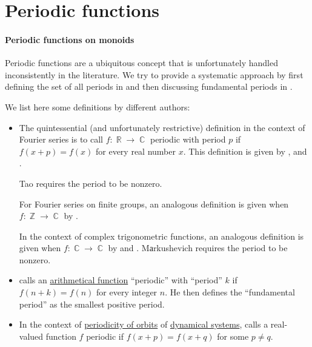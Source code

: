 \section{Periodic functions}\label{sec:periodic_functions}

\paragraph{Periodic functions on monoids}

\begin{remark}\label{rem:periodic_functions_and_periods}
  Periodic functions are a ubiquitous concept that is unfortunately handled inconsistently in the literature. We try to provide a systematic approach by first defining the set of all periods in  and then discussing fundamental periods in .

  We list here some definitions by different authors:
  \begin{itemize}
    \item The quintessential (and unfortunately restrictive) definition in the context of Fourier series is to call \( f: \BbbR \to \BbbC \) periodic with period \( p \) if \( f(x + p) = f(x) \) for every real number \( x \). This definition is given by
    ,
     and
    .

    Tao requires the period to be nonzero.

    For Fourier series on finite groups, an analogous definition is given when \( f: \BbbZ \to \BbbC \) by .

    In the context of complex trigonometric functions, an analogous definition is given when \( f: \BbbC \to \BbbC \) by  and . Mаrkushevich requires the period to be nonzero.

    \item {} calls an \hyperref[def:arithmetic_function]{arithmetical function} \enquote{periodic} with \enquote{period} \( k \) if \( f(n + k) = f(n) \) for every integer \( n \). He then defines the \enquote{fundamental period} as the smallest positive period.

    \item In the context of \hyperref[def:orbit_periodicity]{periodicity of orbits} of \hyperref[def:dynamical_system]{dynamical systems},  calls a  real-valued function \( f \) periodic if \( f(x + p) = f(x + q) \) for some \( p \neq q \).


\end{itemize}
\end{remark}
